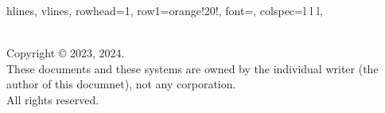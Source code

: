 {{\begin{spacing}{1.2}
\begin{longtblr}[
  theme=commontblr,
  entry=none,
  label=none,
  presep=0pt,
]{%
  hlines,
  vlines,
  rowhead=1,
  row{1}={orange!20!, font=\sffamily\bfseries},
  colspec={l l l},
}
\end{longtblr}
\hrulefill\\
Copyright © 2023, 2024.\\
These documents and these systems are owned by the individual writer (the author of this documnet), not any corporation.\\
All rights reserved.
\end{spacing}
\thispagestyle{emptydate}%
}%
}
